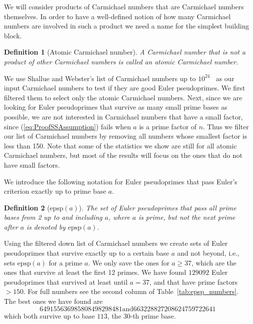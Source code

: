 \documentclass[runningheads]{amsart}
\newtheorem{definition}{Definition}
\newcommand{\epsp}{\mathrm{epsp}}
\begin{document}
We will consider products of Carmichael numbers that are Carmichael numbers themselves.
In order to have a well-defined notion of how many Carmichael numbers are involved
in such a product we need a name for the simplest building block.

\begin{definition}[Atomic Carmichael number]
A Carmichael number that is not a product of other Carmichael numbers is called an
{\em
atomic Carmichael
number}.
\end{definition}

We use Shallue and Webster's list of Carmichael numbers up to
$10^{24}$~\cite{2025/webster}
as our input Carmichael numbers to test if they are good Euler pseudoprimes.
We first filtered them to select only the atomic Carmichael numbers.
Next,
since we are looking for Euler pseudoprimes that survive as many small prime bases
as possible,
we are not interested in Carmichael numbers that have a small factor,
since
(\ref{eq:ProofSSAssumption})
fails when $a$ is a prime factor of $n$.
Thus we filter our list of Carmichael numbers by removing all numbers whose smallest
factor is less than 150.
Note that some of the statistics we show are still for all atomic Carmichael numbers,
but most of the results will focus on the ones that do not have small factors.

We introduce the following notation for Euler pseudoprimes that pass Euler's criterion
exactly up to prime base $a$.
\begin{definition}[$\epsp(a)$]
The set of Euler pseudoprimes that pass all prime bases from 2 up to and including
$a$,
where $a$ is prime,
but not the next prime after $a$ is denoted by
$\epsp(a)$.
\label{def: epsp(a)}
\end{definition}

Using the filtered down list of Carmichael numbers we create sets of Euler pseudoprimes
that survive exactly up to a certain base $a$ and not beyond,
i.e.,
sets
$\epsp(a)$
for a prime $a$.
We only save the ones for $a
\geq
37$,
which are the ones that survive at least the first 12 primes.
We have found $129092$ Euler pseudoprimes that survived at least until $a = 37$,
and that have prime factors
$>150$.
For full numbers see the second column of
Table~\ref{tab:epsp_numbers}.
The best ones we have found are $$649155636985808498298481
\text{
and
}
663228827208624759722641$$ which both survive up to base $113$,
the 30-th prime base.
\end{document}
